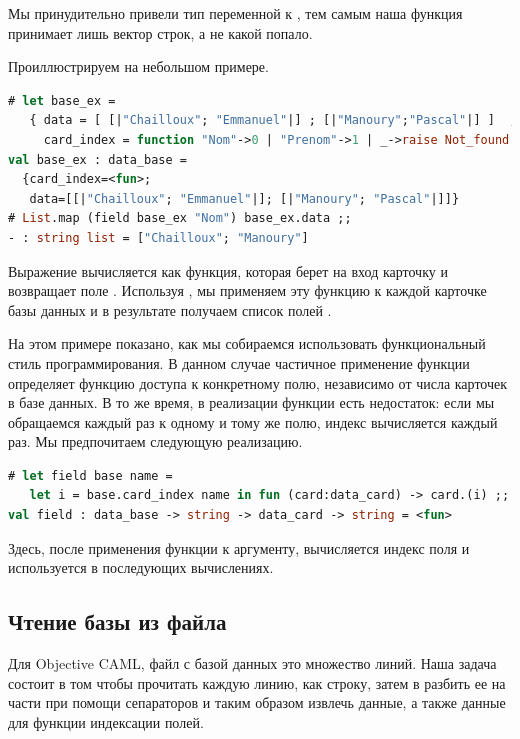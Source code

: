 Мы принудительно привели тип переменной  к , тем 
самым наша функция  принимает лишь вектор строк, а не какой попало.

Проиллюстрируем на небольшом примере.

\begin{lstlisting}[language=OCaml]
# let base_ex = 
   { data = [ [|"Chailloux"; "Emmanuel"|] ; [|"Manoury";"Pascal"|] ]  ;
     card_index = function "Nom"->0 | "Prenom"->1 | _->raise Not_found  } ;;
val base_ex : data_base =
  {card_index=<fun>;
   data=[[|"Chailloux"; "Emmanuel"|]; [|"Manoury"; "Pascal"|]]}
# List.map (field base_ex "Nom") base_ex.data ;;
- : string list = ["Chailloux"; "Manoury"]
\end{lstlisting}

Выражение  вычисляется как функция, которая 
берет на вход карточку и возвращает поле . Используя 
, мы применяем эту функцию к каждой карточке базы данных 
 и в результате получаем список полей .

На этом примере показано, как мы собираемся использовать функциональный стиль 
программирования. В данном случае частичное применение функции  
определяет функцию доступа к конкретному полю, независимо от числа карточек в 
базе данных. В то же время, в реализации функции  есть недостаток: 
если мы обращаемся каждый раз к одному и тому же полю, индекс вычисляется 
каждый раз. Мы предпочитаем следующую реализацию.

\begin{lstlisting}[language=OCaml]
# let field base name = 
   let i = base.card_index name in fun (card:data_card) -> card.(i) ;;
val field : data_base -> string -> data_card -> string = <fun>
\end{lstlisting}

Здесь, после применения функции к аргументу, вычисляется индекс поля и 
используется в последующих вычислениях.

\subsection{Чтение базы из файла}
\label{subsec:reading_a_database_from_a_file}

Для Objective CAML, файл с базой данных это множество линий. Наша задача состоит 
в том чтобы прочитать каждую линию, как строку, затем в разбить ее на части при 
помощи сепараторов и таким образом извлечь данные, а также данные для функции 
индексации полей.

